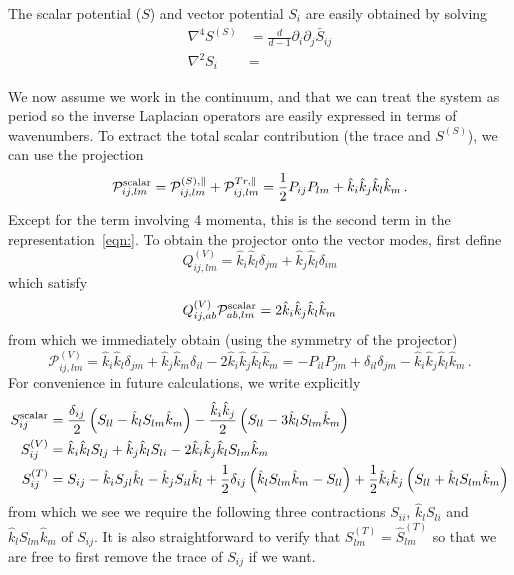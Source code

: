 \documentclass{revtex4}
\newcommand{\proj}{\ensuremath{\mathcal{P}}}
\begin{document}
The scalar potential ($S$) and vector potential $S_i$ are easily obtained by solving
\begin{subequations}
  \begin{align}
    \nabla^4 S^{(S)} &= \frac{d}{d-1}\partial_i\partial_j\bar{S}_{ij} \\
    \nabla^2 S_i &=
  \end{align}
\end{subequations}

We now assume we work in the continuum, and that we can treat the system as period so the inverse Laplacian operators are easily expressed in terms of wavenumbers.
To extract the total scalar contribution (the trace and $S^{(S)}$), we can use the projection
\begin{equation}
   \proj^{{\rm scalar}}_{ij,lm} = \proj_{ij,lm}^{(S),\parallel} + \proj_{ij,lm}^{Tr,\parallel} = \frac{1}{2}P_{ij}P_{lm} + \hat{k}_i\hat{k}_j\hat{k}_l\hat{k}_m \, .
\end{equation}
Except for the term involving 4 momenta, this is the second term in the representation~\eqref{eqn:}.
To obtain the projector onto the vector modes, first define
\begin{equation}
  Q^{(V)}_{ij,lm} = \hat{k}_i\hat{k}_l\delta_{jm} + \hat{k}_j\hat{k}_l\delta_{im}
\end{equation}
which satisfy
\begin{equation}
  Q^{(V)}_{ij,ab}\proj^{{\rm scalar}}_{ab,lm} = 2\hat{k}_i\hat{k}_j\hat{k}_l\hat{k}_m
\end{equation}
from which we immediately obtain (using the symmetry of the projector)
\begin{equation}
  \proj_{ij,lm}^{(V)} = \hat{k}_i\hat{k}_l\delta_{jm} + \hat{k}_j\hat{k}_m\delta_{il} - 2\hat{k}_i\hat{k}_j\hat{k}_l\hat{k}_m = -P_{il}P_{jm} + \delta_{il}\delta_{jm} - \hat{k}_i\hat{k}_j\hat{k}_l\hat{k}_m \, .
\end{equation}
For convenience in future calculations, we write explicitly
\begin{subequations}
\begin{align}
  S_{ij}^{\rm scalar} &= \frac{\delta_{ij}}{2}\left(S_{ll} - \hat{k}_lS_{lm}\hat{k}_m\right) - \frac{\hat{k}_i\hat{k}_j}{2}\left(S_{ll} - 3\hat{k}_lS_{lm}\hat{k}_m\right) \\
  S_{ij}^{(V)} &= \hat{k}_i\hat{k}_lS_{lj} + \hat{k}_j\hat{k}_lS_{li} - 2\hat{k}_i\hat{k}_j\hat{k}_lS_{lm}\hat{k}_m \\
  S_{ij}^{(T)} &= S_{ij} - \hat{k}_iS_{jl}\hat{k}_l - \hat{k}_jS_{il}\hat{k}_l + \frac{1}{2}\delta_{ij}\left(\hat{k}_lS_{lm}\hat{k}_m - S_{ll}\right) + \frac{1}{2}\hat{k}_i\hat{k}_j\left(S_{ll}+\hat{k}_lS_{lm}\hat{k}_m\right) \\
\end{align}
\end{subequations}
from which we see we require the following three contractions $S_{ii}$, $\hat{k}_lS_{li}$ and $\hat{k}_lS_{lm}\hat{k}_m$ of $S_{ij}$.
It is also straightforward to verify that $S_{lm}^{(T)} = \hat{S}_{lm}^{(T)}$ so that we are free to first remove the trace of $S_{ij}$ if we want.
\end{document}
